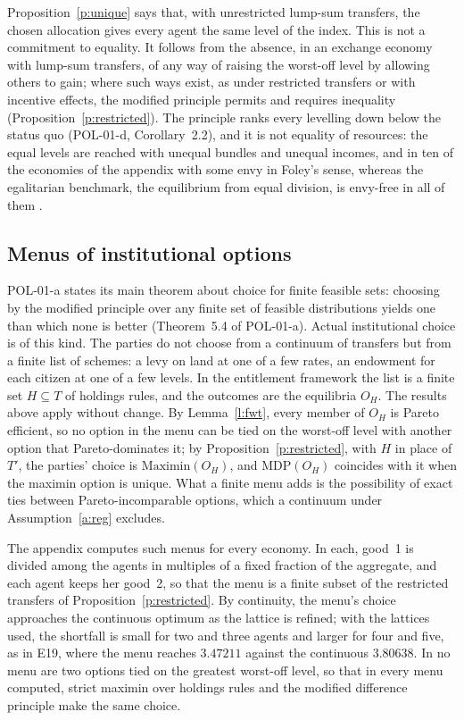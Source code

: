 \documentclass{situationist-preprint}
\begin{document}
\begin{remark}\label{r:equal}
Proposition~\ref{p:unique} says that, with unrestricted lump-sum transfers, the chosen allocation gives every agent the same level of the index. This is not a commitment to equality. It follows from the absence, in an exchange economy with lump-sum transfers, of any way of raising the worst-off level by allowing others to gain; where such ways exist, as under restricted transfers or with incentive effects, the modified principle permits and requires inequality (Proposition~\ref{p:restricted}). The principle ranks every levelling down below the status quo (POL-01-d, Corollary~2.2), and it is not equality of resources: the equal levels are reached with unequal bundles and unequal incomes, and in ten of the economies of the appendix with some envy in Foley's sense, whereas the egalitarian benchmark, the equilibrium from equal division, is envy-free in all of them \citep{Varian1974}.
\end{remark}

\subsection{Menus of institutional options}

POL-01-a states its main theorem about choice for finite feasible sets: choosing by the modified principle over any finite set of feasible distributions yields one than which none is better (Theorem~5.4 of POL-01-a). Actual institutional choice is of this kind. The parties do not choose from a continuum of transfers but from a finite list of schemes: a levy on land at one of a few rates, an endowment for each citizen at one of a few levels. In the entitlement framework the list is a finite set $H \subseteq T$ of holdings rules, and the outcomes are the equilibria $O_H$. The results above apply without change. By Lemma~\ref{l:fwt}, every member of $O_H$ is Pareto efficient, so no option in the menu can be tied on the worst-off level with another option that Pareto-dominates it; by Proposition~\ref{p:restricted}, with $H$ in place of $T'$, the parties' choice is $\mathrm{Maximin}(O_H)$, and $\mathrm{MDP}(O_H)$ coincides with it when the maximin option is unique. What a finite menu adds is the possibility of exact ties between Pareto-incomparable options, which a continuum under Assumption~\ref{a:reg} excludes.

The appendix computes such menus for every economy. In each, good~1 is divided among the agents in multiples of a fixed fraction of the aggregate, and each agent keeps her good~2, so that the menu is a finite subset of the restricted transfers of Proposition~\ref{p:restricted}. By continuity, the menu's choice approaches the continuous optimum as the lattice is refined; with the lattices used, the shortfall is small for two and three agents and larger for four and five, as in E19, where the menu reaches $3.47211$ against the continuous $3.80638$. In no menu are two options tied on the greatest worst-off level, so that in every menu computed, strict maximin over holdings rules and the modified difference principle make the same choice.
\end{document}
